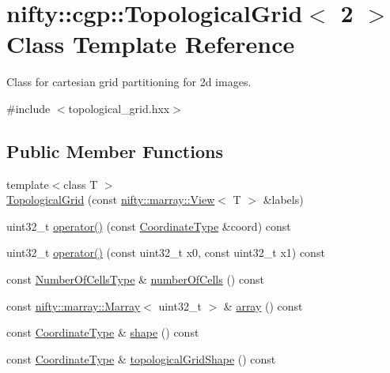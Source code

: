 \hypertarget{classnifty_1_1cgp_1_1TopologicalGrid_3_012_01_4}{}\section{nifty\+:\+:cgp\+:\+:Topological\+Grid$<$ 2 $>$ Class Template Reference}
\label{classnifty_1_1cgp_1_1TopologicalGrid_3_012_01_4}


Class for cartesian grid partitioning for 2d images.  




{\ttfamily \#include $<$topological\+\_\+grid.\+hxx$>$}

\subsection*{Public Member Functions}
\begin{DoxyCompactItemize}
\item 
{\footnotesize template$<$class T $>$ }\\\hyperlink{classnifty_1_1cgp_1_1TopologicalGrid_3_012_01_4_a7f422c1535a4d760394676b59a1999fd}{Topological\+Grid} (const \hyperlink{classandres_1_1View}{nifty\+::marray\+::\+View}$<$ T $>$ \&labels)
\item 
uint32\+\_\+t \hyperlink{classnifty_1_1cgp_1_1TopologicalGrid_3_012_01_4_aa502cc18faa020ccf8a145a3a1ca0aca}{operator()} (const \hyperlink{classnifty_1_1array_1_1ArrayExtender}{Coordinate\+Type} \&coord) const
\item 
uint32\+\_\+t \hyperlink{classnifty_1_1cgp_1_1TopologicalGrid_3_012_01_4_a8198fbeb1a21acd658d80fb7bc6ffaa3}{operator()} (const uint32\+\_\+t x0, const uint32\+\_\+t x1) const
\item 
const \hyperlink{classnifty_1_1array_1_1ArrayExtender}{Number\+Of\+Cells\+Type} \& \hyperlink{classnifty_1_1cgp_1_1TopologicalGrid_3_012_01_4_a7ad179c3608eb9b975c2f647bfae8209}{number\+Of\+Cells} () const
\item 
const \hyperlink{classandres_1_1Marray}{nifty\+::marray\+::\+Marray}$<$ uint32\+\_\+t $>$ \& \hyperlink{classnifty_1_1cgp_1_1TopologicalGrid_3_012_01_4_ac34e6a5f4e42bb18925dd06c87c37afa}{array} () const
\item 
const \hyperlink{classnifty_1_1array_1_1ArrayExtender}{Coordinate\+Type} \& \hyperlink{classnifty_1_1cgp_1_1TopologicalGrid_3_012_01_4_a7890acb41f10bfaa362d08ee526118a1}{shape} () const
\item 
const \hyperlink{classnifty_1_1array_1_1ArrayExtender}{Coordinate\+Type} \& \hyperlink{classnifty_1_1cgp_1_1TopologicalGrid_3_012_01_4_ab01ea42db3fe97a55f64024f0efa11c0}{topological\+Grid\+Shape} () const
\end{DoxyCompactItemize}



